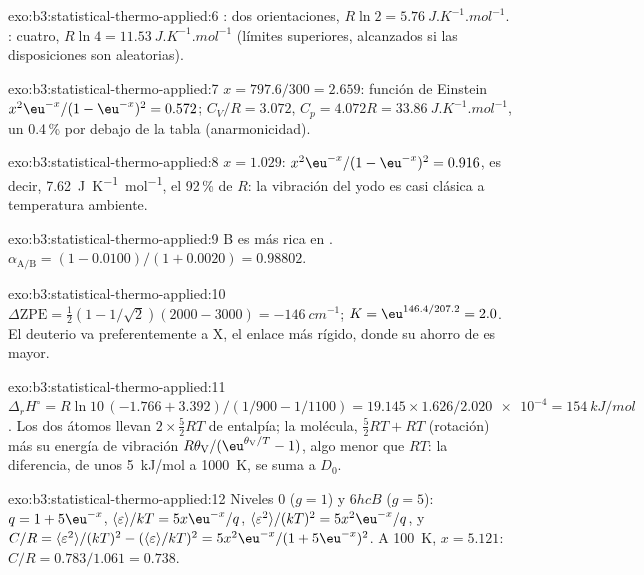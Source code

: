 \begin{solution}{exo:b3:statistical-thermo-applied:6}
: dos orientaciones, $R\ln2 = \qty{5.76}{J.K^{-1}.mol^{-1}}$. : cuatro, $R\ln4 =
\qty{11.53}{J.K^{-1}.mol^{-1}}$ (límites superiores, alcanzados si las disposiciones son aleatorias).
\end{solution}

\begin{solution}{exo:b3:statistical-thermo-applied:7}
$x = 797.6/300 = 2.659$: función de Einstein $x^2\eu^{-x}/(1 - \eu^{-x})^2 = 0.572$; $C_V/R = 3.072$,
$C_p = 4.072R = \qty{33.86}{J.K^{-1}.mol^{-1}}$, un 0.4\,\% por debajo de la tabla (anarmonicidad).
\end{solution}

\begin{solution}{exo:b3:statistical-thermo-applied:8}
$x = 1.029$: $x^2\eu^{-x}/(1 - \eu^{-x})^2 = 0.916$, es decir, \qty{7.62}{J.K^{-1}.mol^{-1}}, el 92\,\% de $R$: la
vibración del yodo es casi clásica a temperatura ambiente.
\end{solution}

\begin{solution}{exo:b3:statistical-thermo-applied:9}
B es más rica en . $\alpha_{\mathrm{A/B}} = (1 - 0.0100)/(1 + 0.0020) = 0.98802$.
\end{solution}

\begin{solution}{exo:b3:statistical-thermo-applied:10}
$\Delta\mathrm{ZPE} = \frac12(1 - 1/\sqrt2)(2000 - 3000) = \qty{-146}{cm^{-1}}$; $K = \eu^{146.4/207.2} = 2.0$.
El deuterio va preferentemente a X, el enlace más rígido, donde su ahorro de  es mayor.
\end{solution}

\begin{solution}{exo:b3:statistical-thermo-applied:11}
$\Delta_rH^\circ = R\ln10\,(-1.766 + 3.392)/(1/900 - 1/1100) = 19.145 \times 1.626/\num{2.020e-4} =
\qty{154}{kJ/mol}$. Los dos átomos llevan $2 \times \frac52RT$ de entalpía; la molécula, $\frac52RT + RT$
(rotación) más su energía de vibración $R\theta_{\mathrm V}/(\eu^{\theta_{\mathrm V}/T} - 1)$, algo menor que $RT$:
la diferencia, de unos \qty{5}{kJ/mol} a \qty{1000}{K}, se suma a $D_0$.
\end{solution}

\begin{solution}{exo:b3:statistical-thermo-applied:12}
Niveles 0 ($g = 1$) y $6hcB$ ($g = 5$): $q = 1 + 5\eu^{-x}$, $\langle\varepsilon\rangle/kT = 5x\eu^{-x}/q$, $\langle\varepsilon^2\rangle/(kT)^2 =
5x^2\eu^{-x}/q$, y $C/R = \langle\varepsilon^2\rangle/(kT)^2 - (\langle\varepsilon\rangle/kT)^2 = 5x^2\eu^{-x}/(1 + 5\eu^{-x})^2$. A
\qty{100}{K}, $x = 5.121$: $C/R = 0.783/1.061 = 0.738$.
\end{solution}

